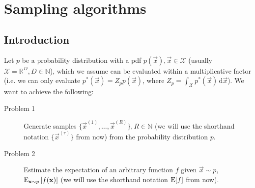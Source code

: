 \chapter{Sampling algorithms}
\section{Introduction}
    Let $p$ be a probability distribution with a pdf $p(\vec x), \vec x \in \mathcal X$ (usually $\mathcal X = \mathbb R^D, D \in \mathbb N$), which we assume can be evaluated within a multiplicative factor (i.e. we can only evaluate $p^\ast(\vec x) = Z_p p(\vec x)$, where $Z_p = \int_{\mathcal X} p^\ast(\vec x)\,\mathrm d\vec x$). We want to achieve the following:
    \begin{description}
        \item[Problem 1] Generate samples $\{\vec x^{(1)}, \dotsc, \vec x^{(R)}\}, R \in \mathbb N$ (we will use the shorthand notation $\{\vec x^{(r)}\}$ from now) from the probability distribution $p$.
        \item[Problem 2] Estimate the expectation of an arbitrary function $f$ given $\vec x \sim p$, $\operatorname{\mathrm{E}}_{\boldsymbol{\mathbf{x}} \sim p}\left[f(\boldsymbol{\mathbf{x}})\right]$ (we will use the shorthand notation $\operatorname{\mathrm{E}}[f]$ from now). 
    \end{description}







